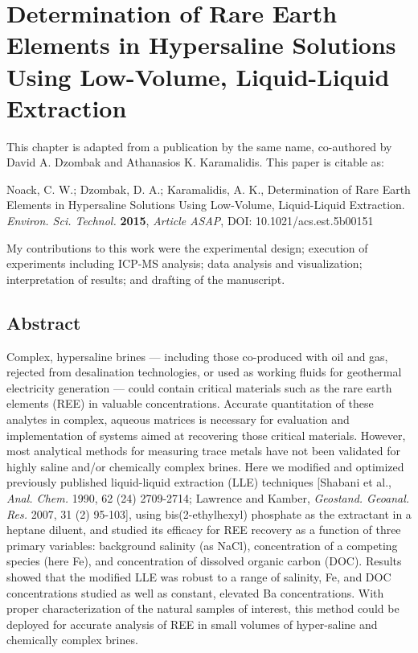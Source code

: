 \chapter{Determination of Rare Earth Elements in Hypersaline Solutions Using Low-Volume, Liquid-Liquid Extraction}

This chapter is adapted from a publication by the same name, co-authored by David A. Dzombak and Athanasios K. Karamalidis.
This paper is citable as: 

Noack, C. W.; Dzombak, D. A.; Karamalidis, A. K., Determination of Rare Earth Elements in Hypersaline Solutions Using Low-Volume, Liquid-Liquid Extraction. \textit{Environ. Sci. Technol.} \textbf{2015}, \textit{Article ASAP}, DOI: 10.1021/acs.est.5b00151

My contributions to this work were the experimental design; execution of experiments including ICP-MS analysis; data analysis and visualization; interpretation of results; and drafting of the manuscript.

\clearpage

\section*{Abstract}
Complex, hypersaline brines --- including those co-produced with oil and gas, rejected from desalination technologies, or used as working fluids for geothermal electricity generation --- could contain critical materials such as the rare earth elements (REE) in valuable concentrations.
Accurate quantitation of these analytes in complex, aqueous matrices is necessary for evaluation and implementation of systems aimed at recovering those critical materials.
However, most analytical methods for measuring trace metals have not been validated for highly saline and/or chemically complex brines.
Here we modified and optimized previously published liquid-liquid extraction (LLE) techniques [Shabani et al., \textit{Anal. Chem.} 1990, 62 (24) 2709-2714; Lawrence and Kamber, \textit{Geostand. Geoanal. Res.} 2007, 31 (2) 95-103], using bis(2-ethylhexyl) phosphate as the extractant in a heptane diluent, and studied its efficacy for REE recovery as a function of three primary variables: background salinity (as NaCl), concentration of a competing species (here Fe), and concentration of dissolved organic carbon (DOC).
Results showed that the modified LLE was robust to a range of salinity, Fe, and DOC concentrations studied as well as constant, elevated Ba concentrations.
With proper characterization of the natural samples of interest, this method could be deployed for accurate analysis of REE in small volumes of hyper-saline and chemically complex brines.


